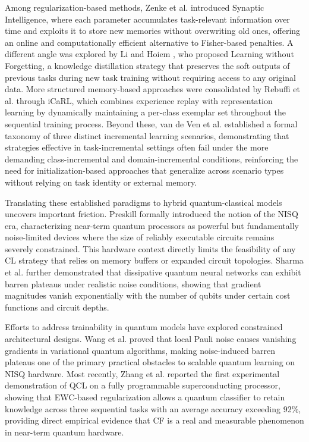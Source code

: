 \documentclass[conference]{IEEEtran}
\begin{document}
Among regularization-based methods, Zenke et al. \cite{b19} introduced Synaptic Intelligence, where each parameter accumulates task-relevant information over time and exploits it to store new memories without overwriting old ones, offering an online and computationally efficient alternative to Fisher-based penalties. A different angle was explored by Li and Hoiem \cite{b20}, who proposed Learning without Forgetting, a knowledge distillation strategy that preserves the soft outputs of previous tasks during new task training without requiring access to any original data. More structured memory-based approaches were consolidated by Rebuffi et al. \cite{b21} through iCaRL, which combines experience replay with representation learning by dynamically maintaining a per-class exemplar set throughout the sequential training process. Beyond these, van de Ven et al. \cite{b22} established a formal taxonomy of three distinct incremental learning scenarios, demonstrating that strategies effective in task-incremental settings often fail under the more demanding class-incremental and domain-incremental conditions, reinforcing the need for initialization-based approaches that generalize across scenario types without relying on task identity or external memory.

Translating these established paradigms to hybrid quantum-classical models uncovers important friction. Preskill \cite{b23} formally introduced the notion of the NISQ era, characterizing near-term quantum processors as powerful but fundamentally noise-limited devices where the size of reliably executable circuits remains severely constrained. This hardware context directly limits the feasibility of any CL strategy that relies on memory buffers or expanded circuit topologies. Sharma et al. \cite{b24} further demonstrated that dissipative quantum neural networks can exhibit barren plateaus under realistic noise conditions, showing that gradient magnitudes vanish exponentially with the number of qubits under certain cost functions and circuit depths.

Efforts to address trainability in quantum models have explored constrained architectural designs. Wang et al. \cite{b25} proved that local Pauli noise causes vanishing gradients in variational quantum algorithms, making noise-induced barren plateaus one of the primary practical obstacles to scalable quantum learning on NISQ hardware. Most recently, Zhang et al. \cite{b26} reported the first experimental demonstration of QCL on a fully programmable superconducting processor, showing that EWC-based regularization allows a quantum classifier to retain knowledge across three sequential tasks with an average accuracy exceeding 92\%, providing direct empirical evidence that CF is a real and measurable phenomenon in near-term quantum hardware.
\end{document}
